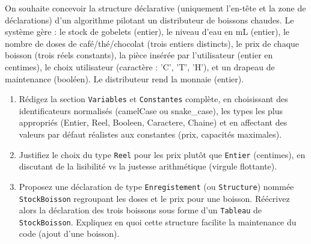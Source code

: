 \documentclass[11pt]{article}
\begin{document}
\begin{exercice}
On souhaite concevoir la structure déclarative (uniquement l'en-tête et la zone de déclarations) d'un algorithme pilotant un distributeur de boissons chaudes. Le système gère : le stock de gobelets (entier), le niveau d'eau en mL (entier), le nombre de doses de café/thé/chocolat (trois entiers distincts), le prix de chaque boisson (trois réels constants), la pièce insérée par l'utilisateur (entier en centimes), le choix utilisateur (caractère : 'C', 'T', 'H'), et un drapeau de maintenance (booléen). Le distributeur rend la monnaie (entier).

\begin{enumerate}
    \item Rédigez la section \texttt{Variables} et \texttt{Constantes} complète, en choisissant des identificateurs normalisés (camelCase ou snake\_case), les types les plus appropriés (Entier, Reel, Booleen, Caractere, Chaine) et en affectant des valeurs par défaut réalistes aux constantes (prix, capacités maximales).
    \item Justifiez le choix du type \texttt{Reel} pour les prix plutôt que \texttt{Entier} (centimes), en discutant de la lisibilité vs la justesse arithmétique (virgule flottante).
    \item Proposez une déclaration de type \texttt{Enregistement} (ou \texttt{Structure}) nommée \texttt{StockBoisson} regroupant les doses et le prix pour une boisson. Réécrivez alors la déclaration des trois boissons sous forme d'un \texttt{Tableau} de \texttt{StockBoisson}. Expliquez en quoi cette structure facilite la maintenance du code (ajout d'une boisson).
\end{enumerate}
\end{exercice}
\end{document}
